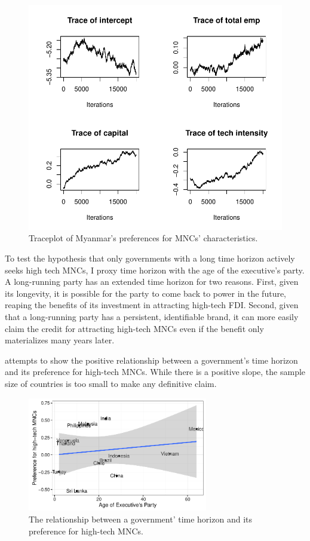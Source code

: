 \begin{figure}[!ht]
\centering
\includegraphics[width=\textwidth,keepaspectratio]{../figure/traceplot_myanmar}
\caption{Traceplot of Myanmar's preferences for MNCs' characteristics.}
\label{fig:traceplot_myanmar}
\end{figure}

To test the hypothesis that only governments with a long time horizon actively seeks high tech MNCs, I proxy time horizon with the age of the executive's party. A long-running party has an extended time horizon for two reasons. First, given its longevity, it is possible for the party to come back to power in the future, reaping the benefits of its investment in attracting high-tech FDI. Second, given that a long-running party has a persistent, identifiable brand, it can more easily claim the credit for attracting high-tech MNCs even if the benefit only materializes many years later.

 attempts to show the positive relationship between a government's time horizon and its preference for high-tech MNCs. While there is a positive slope, the sample size of countries is too small to make any definitive claim.

\begin{figure}[!ht]
\centering
\includegraphics[width=0.7\textwidth,keepaspectratio]{../figure/preference_for_tech}
\caption{The relationship between a government' time horizon and its preference for high-tech MNCs.}
\label{fig:preference_for_tech}
\end{figure}
